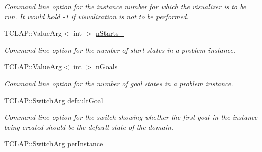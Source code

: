 \begin{DoxyCompactItemize}
\begin{DoxyCompactList}\small\item\em Command line option for the instance number for which the visualizer is to be run. It would hold -\/1 if visualization is not to be performed. \end{DoxyCompactList}\item 
T\+C\+L\+A\+P\+::\+Value\+Arg$<$ int $>$ \hyperlink{structcommandLine_1_1CommandLine_a15401609ce2544d5a85d7615cafb2b5f}{n\+Starts\+\_\+}\hypertarget{structcommandLine_1_1CommandLine_a15401609ce2544d5a85d7615cafb2b5f}{}\label{structcommandLine_1_1CommandLine_a15401609ce2544d5a85d7615cafb2b5f}

\begin{DoxyCompactList}\small\item\em Command line option for the number of start states in a problem instance. \end{DoxyCompactList}\item 
T\+C\+L\+A\+P\+::\+Value\+Arg$<$ int $>$ \hyperlink{structcommandLine_1_1CommandLine_a3b3d4da19e80328dd3b86915cc68372f}{n\+Goals\+\_\+}\hypertarget{structcommandLine_1_1CommandLine_a3b3d4da19e80328dd3b86915cc68372f}{}\label{structcommandLine_1_1CommandLine_a3b3d4da19e80328dd3b86915cc68372f}

\begin{DoxyCompactList}\small\item\em Command line option for the number of goal states in a problem instance. \end{DoxyCompactList}\item 
T\+C\+L\+A\+P\+::\+Switch\+Arg \hyperlink{structcommandLine_1_1CommandLine_a8724c7c64fa0de4800c48b2d41fbfeb1}{default\+Goal\+\_\+}\hypertarget{structcommandLine_1_1CommandLine_a8724c7c64fa0de4800c48b2d41fbfeb1}{}\label{structcommandLine_1_1CommandLine_a8724c7c64fa0de4800c48b2d41fbfeb1}

\begin{DoxyCompactList}\small\item\em Command line option for the switch showing whether the first goal in the instance being created should be the default state of the domain. \end{DoxyCompactList}\item 
T\+C\+L\+A\+P\+::\+Switch\+Arg \hyperlink{structcommandLine_1_1CommandLine_a61fca37265b4e008ce322e8e78709c02}{per\+Instance\+\_\+}\hypertarget{structcommandLine_1_1CommandLine_a61fca37265b4e008ce322e8e78709c02}{}\label{structcommandLine_1_1CommandLine_a61fca37265b4e008ce322e8e78709c02}


\end{DoxyCompactItemize}
